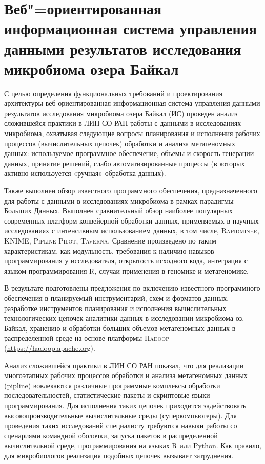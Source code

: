 \documentclass[a4paper,12pt,openany,final]{extreport}
\begin{document}
\chapter{Веб"=ориентированная информационная система управления данными результатов исследования микробиома озера Байкал}\label{chap:6}

С целью определения функциональных требований и проектирования
архитектуры веб-ориентированная информационная система управления
данными результатов исследования микробиома озера Байкал (ИС) проведен
анализ сложившейся практики в ЛИН СО РАН работы с данными в
исследованиях микробиома, охватывая следующие вопросы планирования и
исполнения рабочих процессов (вычислительных цепочек) обработки и
анализа метагеномных данных: используемое программное обеспечение,
объемы и скорость генерации данных, принятие решений, слабо
автоматизированные процессы (в которых активно используется «ручная»
обработка данных).

Также выполнен обзор известного программного обеспечения,
предназначенного для работы с данными в исследованиях микробиома в
рамках парадигмы Больших Данных. Выполнен сравнительный обзор наиболее
популярных современных платформ конвейерной обработки данных,
применяемых в научных исследованиях с интенсивным использованием данных,
в том числе, \textsc{Rapidminer}, KNIME, \textsc{Pipline Pilot},
\textsc{Taverna}. Сравнение произведено по таким характеристикам, как
модульность, требования к наличию навыков программирования у
исследователя, открытость исходного кода, интеграция с языком
программирования R, случаи применения в геномике и метагеномике.

В результате подготовлены предложения по включению известного
программного обеспечения в планируемый инструментарий, схем и форматов
данных, разработке инструментов планирования и исполнения вычислительных
технологических цепочек аналитики данных в исследовании микробиома оз.
Байкал, хранению и обработки больших объемов метагеномных данных в
распределенной среде на основе платформы \textsc{Hadoop}
(\href{https://hadoop.apache.org/}{{https://hadoop.apache.org}}).

Анализ сложившейся практики в ЛИН СО РАН показал, что для реализации
многоэтапных рабочих процессов обработки и анализа метагеномных данных
(pipline) вовлекаются различные программные комплексы обработки
последовательностей, статистические пакеты и скриптовые языки
программирования. Для исполнения таких цепочек приходится задействовать
высокопроизводительные вычислительные среды (суперкомпьютеры). Для
проведения таких исследований специалисту требуются навыки работы со
сценариями командной оболочки, запуска пакетов в распределенной
вычислительной среде, программирования на языках R или Python. Как
правило, для микробиологов реализация подобных цепочек вызывает
затруднения.
\end{document}
